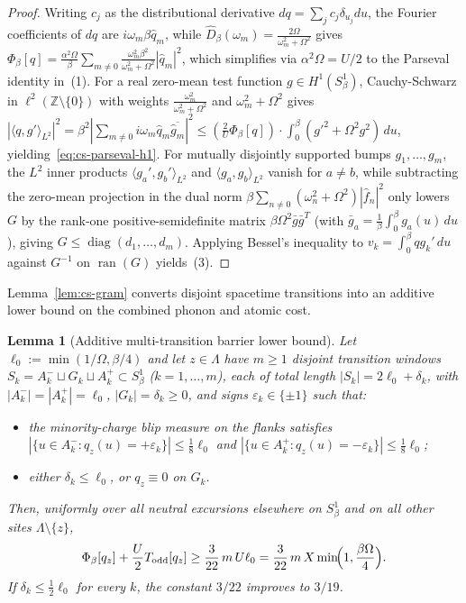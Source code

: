 \documentclass[11pt]{article}
\newtheorem{lemma}[theorem]{Lemma}
\theoremstyle{definition}
\theoremstyle{remark}
\DeclareMathOperator{\diag}{diag}
\newcommand{\Z}{\mathbb{Z}}
\begin{document}
\begin{proof}
Writing $c_j$ as the distributional derivative $dq = \sum_j c_j \delta_{u_j} du$,
the Fourier coefficients of $dq$ are $i\omega_m \beta \hat{q}_m$, while
$\hat{D}_\beta(\omega_m) = \frac{2\Omega}{\omega_m^2 + \Omega^2}$ gives
$\Phi_\beta[q] = \frac{\alpha^2 \Omega}{\beta}\sum_{m \ne 0} \frac{\omega_m^2 \beta^2}{\omega_m^2 + \Omega^2}|\hat{q}_m|^2$,
which simplifies via $\alpha^2 \Omega = U/2$ to the Parseval identity in~(1).
For a real zero-mean test function $g \in H^1(S^1_\beta)$,
Cauchy-Schwarz in $\ell^2(\Z \setminus \{0\})$ with weights
$\frac{\omega_m^2}{\omega_m^2 + \Omega^2}$ and $\omega_m^2 + \Omega^2$ gives
$|\langle q, g'\rangle_{L^2}|^2 = \beta^2 |\sum_{m\ne 0} i\omega_m \hat{q}_m \overline{\hat{g}_m}|^2 \le (\frac{2}{U}\Phi_\beta[q])\cdot \int_0^\beta (g'^2 + \Omega^2 g^2)\,du$,
yielding~\eqref{eq:cs-parseval-h1}. For mutually disjointly supported bumps
$g_1,\dots,g_m$, the $L^2$ inner products $\langle g_a', g_b'\rangle_{L^2}$ and
$\langle g_a, g_b\rangle_{L^2}$ vanish for $a \ne b$, while subtracting the zero-mean
projection in the dual norm $\beta \sum_{n \ne 0}(\omega_n^2 + \Omega^2)|\hat{f}_n|^2$
only lowers $G$ by the rank-one positive-semidefinite matrix
$\beta\Omega^2 \bar{g}\bar{g}^T$ (with $\bar{g}_a = \frac{1}{\beta}\int_0^\beta g_a(u)\,du$),
giving $G \le \diag(d_1,\dots,d_m)$. Applying Bessel's inequality to
$v_k = \int_0^\beta q g_k'\,du$ against $G^{-1}$ on $\operatorname{ran}(G)$
yields~(3).
\end{proof}

Lemma~\ref{lem:cs-gram} converts disjoint spacetime transitions into an additive
lower bound on the combined phonon and atomic cost.

\begin{lemma}[Additive multi-transition barrier lower bound]
\label{lem:cs-barrier}
Let $\ell_0 := \min(1/\Omega, \beta/4)$ and let $z \in \Lambda$ have $m \ge 1$
disjoint transition windows $S_k = A_k^- \sqcup G_k \sqcup A_k^+ \subset S^1_\beta$
($k=1,\dots,m$), each of total length $|S_k| = 2\ell_0 + \delta_k$, with
$|A_k^-| = |A_k^+| = \ell_0$, $|G_k| = \delta_k \ge 0$, and signs
$\varepsilon_k \in \{\pm 1\}$ such that:
\begin{itemize}[leftmargin=1.5em]
\item the minority-charge blip measure on the flanks satisfies
$|\{u \in A_k^- : q_z(u) = +\varepsilon_k\}| \le \frac{1}{8}\ell_0$ and
$|\{u \in A_k^+ : q_z(u) = -\varepsilon_k\}| \le \frac{1}{8}\ell_0$;
\item either $\delta_k \le \ell_0$, or $q_z \equiv 0$ on $G_k$.
\end{itemize}
Then, uniformly over all neutral excursions elsewhere on $S^1_\beta$ and on
all other sites $\Lambda \setminus \{z\}$,
\begin{equation}
\label{eq:cs-barrier}
\Phi_\beta[q_z] + \frac{U}{2} T_{\mathrm{odd}}[q_z]
\ge \frac{3}{22}\, m\, U \ell_0
= \frac{3}{22}\, m\, X \min\!\Bigl(1, \frac{\beta\Omega}{4}\Bigr).
\end{equation}
If $\delta_k \le \frac{1}{2}\ell_0$ for every $k$, the constant $3/22$ improves
to $3/19$.
\end{lemma}
\end{document}
